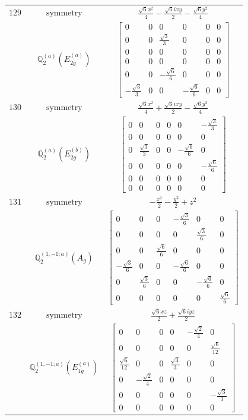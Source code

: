\documentclass[fleqn,8pt,landscape]{jsarticle}
\begin{document}
\begin{longtable}{ccc}
$ 129 $ & $ \text{symmetry} $ & $ \frac{\sqrt{6} x^{2}}{4} - \frac{\sqrt{6} i x y}{2} - \frac{\sqrt{6} y^{2}}{4} $ \\
$  $ & $ \mathbb{Q}_{2}^{(a)}(E_{2g}^{(a)}) $ & $ \begin{bmatrix} 0 & 0 & 0 & 0 & 0 & 0 \\ 0 & 0 & \frac{\sqrt{3}}{3} & 0 & 0 & 0 \\ 0 & 0 & 0 & 0 & 0 & 0 \\ 0 & 0 & 0 & 0 & 0 & 0 \\ 0 & 0 & - \frac{\sqrt{6}}{6} & 0 & 0 & 0 \\ - \frac{\sqrt{3}}{3} & 0 & 0 & - \frac{\sqrt{6}}{6} & 0 & 0 \end{bmatrix} $ \\ \hline
$ 130 $ & $ \text{symmetry} $ & $ \frac{\sqrt{6} x^{2}}{4} + \frac{\sqrt{6} i x y}{2} - \frac{\sqrt{6} y^{2}}{4} $ \\
$  $ & $ \mathbb{Q}_{2}^{(a)}(E_{2g}^{(b)}) $ & $ \begin{bmatrix} 0 & 0 & 0 & 0 & 0 & - \frac{\sqrt{3}}{3} \\ 0 & 0 & 0 & 0 & 0 & 0 \\ 0 & \frac{\sqrt{3}}{3} & 0 & 0 & - \frac{\sqrt{6}}{6} & 0 \\ 0 & 0 & 0 & 0 & 0 & - \frac{\sqrt{6}}{6} \\ 0 & 0 & 0 & 0 & 0 & 0 \\ 0 & 0 & 0 & 0 & 0 & 0 \end{bmatrix} $ \\ \hline
$ 131 $ & $ \text{symmetry} $ & $ - \frac{x^{2}}{2} - \frac{y^{2}}{2} + z^{2} $ \\
$  $ & $ \mathbb{Q}_{2}^{(1,-1;a)}(A_{g}) $ & $ \begin{bmatrix} 0 & 0 & 0 & - \frac{\sqrt{3}}{6} & 0 & 0 \\ 0 & 0 & 0 & 0 & \frac{\sqrt{3}}{6} & 0 \\ 0 & 0 & \frac{\sqrt{6}}{6} & 0 & 0 & 0 \\ - \frac{\sqrt{3}}{6} & 0 & 0 & - \frac{\sqrt{6}}{6} & 0 & 0 \\ 0 & \frac{\sqrt{3}}{6} & 0 & 0 & - \frac{\sqrt{6}}{6} & 0 \\ 0 & 0 & 0 & 0 & 0 & \frac{\sqrt{6}}{6} \end{bmatrix} $ \\ \hline
$ 132 $ & $ \text{symmetry} $ & $ \frac{\sqrt{6} x z}{2} + \frac{\sqrt{6} i y z}{2} $ \\
$  $ & $ \mathbb{Q}_{2}^{(1,-1;a)}(E_{1g}^{(a)}) $ & $ \begin{bmatrix} 0 & 0 & 0 & 0 & - \frac{\sqrt{2}}{4} & 0 \\ 0 & 0 & 0 & 0 & 0 & \frac{\sqrt{6}}{12} \\ \frac{\sqrt{6}}{12} & 0 & 0 & \frac{\sqrt{3}}{3} & 0 & 0 \\ 0 & - \frac{\sqrt{2}}{4} & 0 & 0 & 0 & 0 \\ 0 & 0 & 0 & 0 & 0 & - \frac{\sqrt{3}}{3} \\ 0 & 0 & 0 & 0 & 0 & 0 \end{bmatrix} $ \\ \hline

\end{longtable}
\end{document}
